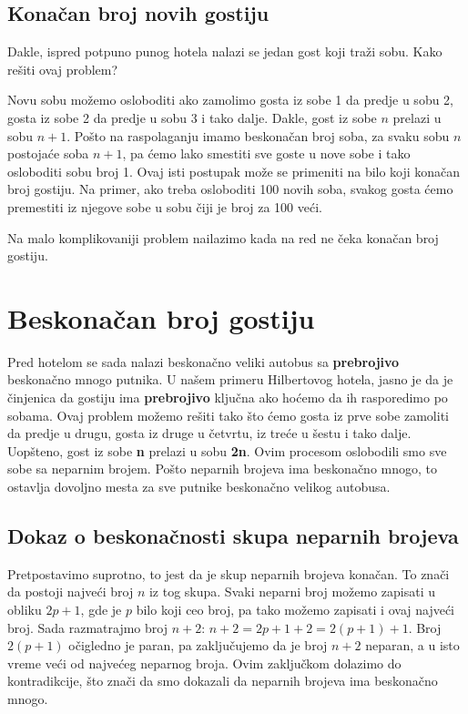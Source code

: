 \documentclass[a4paper]{article}
\begin{document}
\subsection{Konačan broj novih gostiju}
Dakle, ispred potpuno punog hotela nalazi se jedan gost koji traži sobu. Kako rešiti ovaj problem?

Novu sobu možemo osloboditi ako zamolimo gosta iz sobe 1 da predje u sobu 2, gosta iz sobe 2 da predje u sobu 3 i tako dalje. Dakle, gost iz sobe $n$ prelazi u sobu $n+1$.
Pošto na raspolaganju imamo beskonačan broj soba, za svaku sobu $n$ postojaće soba $n+1$, pa ćemo lako smestiti sve goste u nove sobe i tako osloboditi sobu broj 1.
Ovaj isti postupak može se primeniti na bilo koji konačan broj gostiju. Na primer, ako treba osloboditi 100 novih soba, svakog gosta ćemo premestiti iz njegove sobe u sobu čiji je broj za 100 veći.

Na malo komplikovaniji problem nailazimo kada na red ne čeka konačan broj gostiju.\\

\section{Beskonačan broj gostiju}
\label{poglavlje:beskonačan broj gostiju}
Pred hotelom se sada nalazi beskonačno veliki autobus sa \textbf {prebrojivo} beskonačno mnogo putnika.
U našem primeru Hilbertovog hotela, jasno je da je činjenica da gostiju ima \textbf {prebrojivo} ključna ako hoćemo da ih rasporedimo po sobama.
Ovaj problem možemo rešiti tako što ćemo gosta iz prve sobe zamoliti da predje u drugu, gosta iz druge u četvrtu, iz treće u šestu i tako dalje.
Uopšteno, gost iz sobe \textbf{n} prelazi u sobu \textbf{2n}. Ovim procesom oslobodili smo sve sobe sa neparnim brojem.
Pošto neparnih brojeva ima beskonačno mnogo, to ostavlja dovoljno mesta za sve putnike beskonačno velikog autobusa.

\subsection {Dokaz o beskonačnosti skupa neparnih brojeva}
Pretpostavimo suprotno, to jest da je skup neparnih brojeva konačan.
To znači da postoji najveći broj $n$ iz tog skupa.
Svaki neparni broj možemo zapisati u obliku $2p+1$, gde je $p$ bilo koji ceo broj, pa tako možemo zapisati i ovaj najveći broj.
Sada razmatrajmo broj $n+2$: $n+2=2p+1+2=2(p+1)+1$.
Broj $2(p+1)$ očigledno je paran, pa zaključujemo da je broj $n+2$ neparan, a u isto vreme veći od najvećeg neparnog broja.
Ovim zaključkom dolazimo do kontradikcije, što znači da smo dokazali da neparnih brojeva ima beskonačno mnogo.
\end{document}
